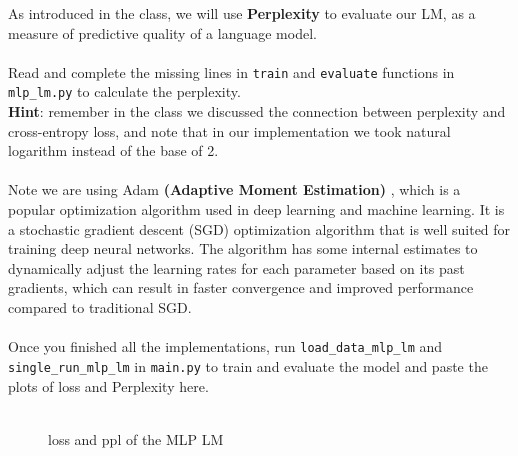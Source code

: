 As introduced in the class, we will use \textbf{Perplexity} to evaluate our LM, as a measure of predictive quality of a language model. \\\\
\noindent \todo{} Read and complete the missing lines in \texttt{train} and \texttt{evaluate} functions in \texttt{mlp\_lm.py} to calculate the perplexity.\\
\noindent \textbf{Hint}: remember in the class we discussed the connection between perplexity and cross-entropy loss, and note that in our implementation we took natural logarithm instead of the base of 2.\\\\
Note we are using Adam \textbf{(Adaptive Moment Estimation)} \citep{kingma2015adam}, which is a popular optimization algorithm used in deep learning and machine learning. It is a stochastic gradient descent (SGD) optimization algorithm that is well suited for training deep neural networks. The algorithm has some internal estimates to dynamically adjust the learning rates for each parameter based on its past gradients, which can result in faster convergence and improved performance compared to traditional SGD.\\\\
\noindent \todo{} Once you finished all the implementations, run \texttt{load\_data\_mlp\_lm} and \texttt{single\_run\_mlp\_lm} in \texttt{main.py} to train and evaluate the model and paste the plots of loss and Perplexity here.\\
\noindent {\color{red}{your plots}}\\

\begin{figure}[h] 
    \centering
    \hfill
    \caption{loss and ppl of the MLP LM}
\end{figure}


